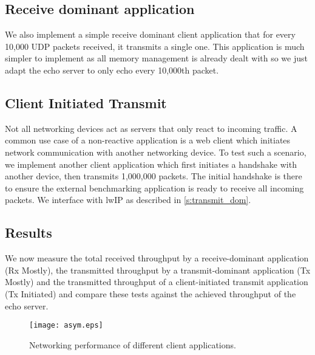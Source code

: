 \subsection{Receive dominant application}
We also implement a simple receive dominant client application that for every 10,000 UDP packets received, it transmits a single one.
This application is much simpler to implement as all memory management is already dealt with so we just adapt the echo server to 
only echo every 10,000th packet.\\

\subsection{Client Initiated Transmit}
Not all networking devices act as servers that only react to incoming traffic. A common use case of a non-reactive application is a 
web client which initiates network communication with another networking device. To test such a scenario, we implement another client
application which first initiates a handshake with another device, then transmits 1,000,000 packets. The initial handshake is there to 
ensure the external benchmarking application is ready to receive all incoming packets. We interface with lwIP as described
in \autoref{s:transmit_dom}.

\subsection{Results}
We now measure the total received throughput by a receive-dominant application (Rx Mostly), the
transmitted throughput by a transmit-dominant application (Tx Mostly) and the transmitted throughput
of a client-initiated transmit application (Tx Initiated) and compare these tests against the achieved
throughput of the echo server. 

\vspace{0.5cm}
\begin{figure}[h]
    \centering
    \texttt{[image: asym.eps]}
    \caption{Networking performance of different client applications.}
    \label{f:asym}
\end{figure}

